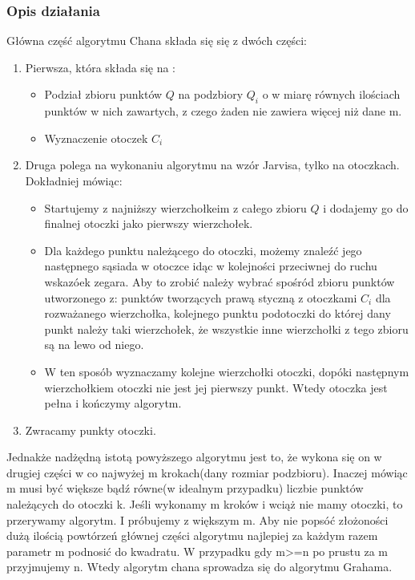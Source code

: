 \documentclass[11pt]{article}
\theoremstyle{remark} \newtheorem{definition}{def.}
\theoremstyle{definition} \newtheorem{twierdzenie}{tw.}
\begin{document}
    \subsubsection{Opis działania}
    Główna część algorytmu Chana składa się  się z dwóch części:
    \begin{enumerate}
        \item   Pierwsza, która składa się  na :
                \begin{itemize}
                    \item   Podział zbioru punktów $Q$ na podzbiory $Q_i$ o w miarę równych
                            ilościach punktów w nich zawartych, z czego żaden nie 
                            zawiera więcej niż dane m. 
                    \item   Wyznaczenie otoczek $C_i$
                \end{itemize}
        \item   Druga polega na wykonaniu algorytmu na wzór Jarvisa, tylko na 
                otoczkach. Dokładniej mówiąc:
                \begin{itemize}
                    \item   Startujemy z najniższy wierzchołkeim z całego zbioru $Q$
                            i dodajemy go do finalnej otoczki jako pierwszy wierzchołek.
                    \item   Dla każdego punktu należącego do otoczki, możemy znaleźć
                            jego następnego sąsiada w otoczce idąc w kolejności przeciwnej
                            do ruchu wskazóek zegara. 
                            Aby to zrobić należy wybrać spośród zbioru punktów utworzonego z:
                            punktów tworzących prawą styczną z otoczkami $C_i$ dla rozważanego
                            wierzchołka, kolejnego punktu podotoczki do której dany punkt należy
                            taki wierzchołek, że wszystkie inne wierzchołki z tego zbioru są
                            na lewo od niego.
                    \item   W ten sposób wyznaczamy kolejne wierzchołki otoczki, dopóki
                            następnym wierzchołkiem otoczki nie jest jej pierwszy punkt.
                            Wtedy otoczka jest pełna i kończymy algorytm.
                \end{itemize}
    
        \item   Zwracamy punkty otoczki. 
    \end{enumerate}
    Jednakże nadżędną istotą powyższego algorytmu jest to, że wykona się on w drugiej
    części w co najwyżej m krokach(dany rozmiar podzbioru). Inaczej mówiąc m musi być
    większe bądź równe(w idealnym przypadku) liczbie punktów należących do otoczki k.
    Jeśli wykonamy m kroków i wciąż nie mamy otoczki, to przerywamy algorytm. I 
    próbujemy z większym m. Aby nie popsóć złożoności dużą ilością powtórzeń głównej
    części algorytmu najlepiej za każdym razem parametr m podnosić do kwadratu. W przypadku
    gdy m>=n po prustu za m przyjmujemy n. Wtedy algorytm chana sprowadza się do algorytmu 
    Grahama.
\end{document}
